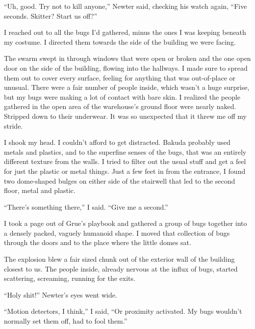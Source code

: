 ``Uh, good.  Try not to kill anyone,'' Newter said, checking his watch again, ``Five seconds.  Skitter?  Start us off?''



I reached out to all the bugs I'd gathered, minus the ones I was keeping beneath my costume.  I directed them towards the side of the building we were facing.



The swarm swept in through windows that were open or broken and the one open door on the side of the building, flowing into the hallways.  I made sure to spread them out to cover every surface, feeling for anything that was out-of-place or unusual.  There were a fair number of people inside, which wasn't a huge surprise, but my bugs were making a lot of contact with bare skin.  I realized the people gathered in the open area of the warehouse's ground floor were nearly naked.  Stripped down to their underwear.  It was so unexpected that it threw me off my stride.



I shook my head.  I couldn't afford to get distracted.  Bakuda probably used metals and plastics, and to the superfine senses of the bugs, that was an entirely different texture from the walls.  I tried to filter out the usual stuff and get a feel for just the plastic or metal things.  Just a few feet in from the entrance, I found two dome-shaped bulges on either side of the stairwell that led to the second floor, metal and plastic.



``There's something there,'' I said.  ``Give me a second.''



I took a page out of Grue's playbook and gathered a group of bugs together into a densely packed, vaguely humanoid shape.  I moved that collection of bugs through the doors and to the place where the little domes sat.



The explosion blew a fair sized chunk out of the exterior wall of the building closest to us.  The people inside, already nervous at the influx of bugs, started scattering, screaming, running for the exits.



``Holy shit!'' Newter's eyes went wide.



``Motion detectors, I think,'' I said, ``Or proximity activated.  My bugs wouldn't normally set them off, had to fool them.''



